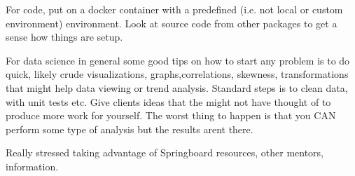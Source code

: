 For code, put on a docker container
with a predefined (i.e. not local or custom 
environment) environment. Look
at source code from other packages to get
a sense how things are setup.


For data science in general some good tips
on how to start any problem is to do
quick, likely crude visualizations,
graphs,correlations, skewness, transformations
that might help data viewing or trend analysis.
Standard steps is to clean data, with unit tests
etc. Give clients ideas that the might not
have thought of to produce more work for yourself.
The worst thing to happen is that you CAN perform
some type of analysis but the results arent there.

Really stressed taking advantage of Springboard
resources, other mentors, information.

